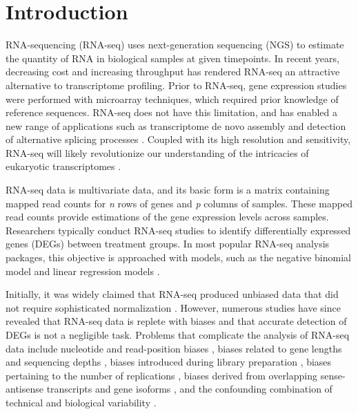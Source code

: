 \documentclass{bioinfo}
\begin{document}
\section{Introduction}

RNA-sequencing (RNA-seq) uses next-generation sequencing (NGS) to estimate the quantity of RNA in biological samples at given timepoints. In recent years, decreasing cost and increasing throughput has rendered RNA-seq an attractive alternative to transcriptome profiling. Prior to RNA-seq, gene expression studies were performed with microarray techniques, which required prior knowledge of reference sequences. RNA-seq does not have this limitation, and has enabled a new range of applications such as transcriptome de novo assembly \citep{Robertson} and detection of alternative splicing processes \citep{Anders2012, Pan}. Coupled with its high resolution and sensitivity, RNA-seq will likely revolutionize our understanding of the intricacies of eukaryotic transcriptomes \citep{Wang, Zhao}.

RNA-seq data is multivariate data, and its basic form is a matrix containing mapped read counts for \textit{n} rows of genes and \textit{p} columns of samples. These mapped read counts provide estimations of the gene expression levels across samples. Researchers typically conduct RNA-seq studies to identify differentially expressed genes (DEGs) between treatment groups. In most popular RNA-seq analysis packages, this objective is approached with models, such as the negative binomial model \citep{Anders2010, Trapnell2012, Trapnell2013, Robinson} and linear regression models \citep{Law}.

Initially, it was widely claimed that RNA-seq produced unbiased data that did not require sophisticated normalization \citep{Wang, Morin, Marioni}. However, numerous studies have since revealed that RNA-seq data is replete with biases and that accurate detection of DEGs is not a negligible task. Problems that complicate the analysis of RNA-seq data include nucleotide and read-position biases \citep{Hansen}, biases related to gene lengths and sequencing depths \citep{Oshlack, RobinsonOshlack}, biases introduced during library preparation \citep{McIntyre}, biases pertaining to the number of replications \citep{Schurch}, biases derived from overlapping sense-antisense transcripts and gene isoforms \citep{Trapnell2013}, and the confounding combination of technical and biological variability \citep{Bullard}.
\end{document}
